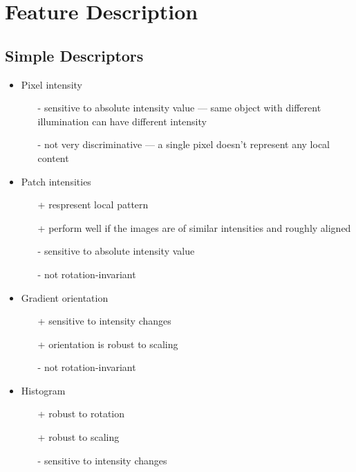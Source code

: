 \documentclass[twocolumn,landscape,10pt]{article}
\theoremstyle{definition}
\begin{document}
\section{Feature Description}

\subsection{Simple Descriptors}

\begin{itemize}
    \item Pixel intensity
        \begin{itemize}
            \item[-] sensitive to absolute intensity value --- same object with
                different illumination can have different intensity
            \item[-] not very discriminative --- a single pixel doesn't
                represent any local content
        \end{itemize} 
    \item Patch intensities
        \begin{itemize}
            \item[+] respresent local pattern
            \item[+] perform well if the images are of similar intensities and roughly
                aligned
            \item[-] sensitive to absolute intensity value
            \item[-] not rotation-invariant
        \end{itemize} 
    \item Gradient orientation
        \begin{itemize}
            \item[+] sensitive to intensity changes
            \item[+] orientation is robust to scaling
            \item[-] not rotation-invariant
        \end{itemize} 
    \item Histogram
        \begin{itemize}
            \item[+] robust to rotation
            \item[+] robust to scaling
            \item[-] sensitive to intensity changes
        \end{itemize} 
\end{itemize} 
\end{document}
